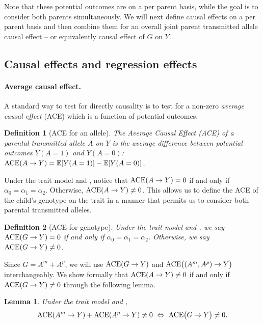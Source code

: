\documentclass[12pt]{extarticle}
\newtheorem{lem}{Lemma}%
\newtheorem{defin}{Definition}%
\newcommand{\ace}{{\normalfont \text{ACE}}}
\begin{document}
 
Note that these potential outcomes are on a per parent basis, while the goal is to consider both parents simultaneously. We will next define causal effects on a per parent basis and then combine them for an overall joint parent transmitted allele causal effect -- or equivalently causal effect of $G$ on $Y$.

\subsection{Causal effects and regression effects} \label{sec:causal_effect}

\paragraph{Average causal effect.} A standard way to test for directly causality is to test for a non-zero \textit{average causal effect} (ACE) which is a function of potential outcomes. 

\begin{defin}[ACE for an allele]\label{def:ace}
The Average Causal Effect (ACE) of a parental transmitted allele $A$ on $Y$ is the average difference between potential outcomes $Y(A=1)$ and $Y(A=0)$: $\ace (A\to Y) = \mathbb{E}[Y(A=1)]-\mathbb{E}[Y(A=0)]$. 
\end{defin}

\noindent Under the trait model and , notice that $\ace (A\to Y)=0$ if and only if $\alpha_0=\alpha_1=\alpha_2$. Otherwise, $\ace(A\to Y) \neq 0$. This allows us to define the ACE of the child's genotype on the trait in a manner that permits us to consider both parental transmitted alleles.

\begin{defin}[ACE for genotype]\label{def:ace_genotype}
Under the trait model and , we say $\ace (G \to Y)= 0$ if and only if $\alpha_0=\alpha_1=\alpha_2$. Otherwise, we say $\ace (G\to Y) \neq 0$.
\end{defin}

Since $G=A^m+A^p$, we will use $\ace(G\to Y)$ and $\ace \big((A^m,A^p)\to Y\big)$ interchangeably.  We show formally that $\ace(A \to Y) \not= 0$ if and only if $\ace(G \to Y) \not= 0$ through the following lemma.
\begin{lem} \label{lem:gma} 
Under the trait model and , 
\begin{equation*}
\ace (A^m\to Y) + \ace (A^p \to Y) \neq 0\,\,\Leftrightarrow \,\,\ace \big(G \to Y\big)\neq 0.
\end{equation*} 
\end{lem} 
\end{document}
